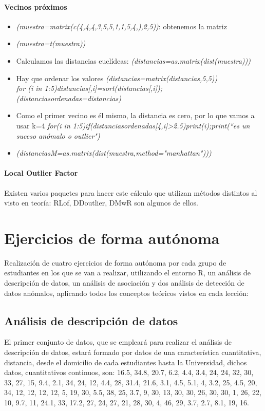 \documentclass[a4paper, 12pt]{article}
\begin{document}
        \paragraph{Vecinos próximos}
        \begin{itemize}
            \item \emph{(muestra=matrix(c(4,4,4,3,5,5,1,1,5,4,),2,5))}: obtenemos la matriz
            \item \emph{(muestra=t(muestra))}
            \item Calculamos las distancias euclídeas: \emph{(distancias=as.matrix(dist(muestra)))}
            \item Hay que ordenar los valores \emph{(distancias=matrix(distancias,5,5))}
            \\ \emph{for (i in 1:5){distancias[,i]=sort(distancias[,i])}; (distanciasordenadas=distancias)}
            \item Como el primer vecino es él mismo, la distancia es cero, por lo que vamos a usar k=4 \emph{for(i in 1:5){if(distanciasordenadas[4,i]>2.5){print(i);print(\textquotedblleft es un suceso anómalo o outlier")}}}
            \item \emph{(distanciasM=as.matrix(dist(muestra,method="manhattan")))}
        \end{itemize}

        \paragraph{Local Outlier Factor}
            Existen varios paquetes para hacer este cálculo que utilizan métodos distintos al visto en teoría: RLof, DDoutlier, DMwR son algunos de ellos.
    
\section{Ejercicios de forma autónoma}
    Realización de cuatro ejercicios de forma autónoma por cada grupo de estudiantes en los que se van a realizar, utilizando el entorno R, un análisis de descripción de datos, un análisis de asociación y dos análisis de detección de datos anómalos, aplicando todos los conceptos teóricos vistos en cada lección:
    
    \subsection{Análisis de descripción de datos}
        El primer conjunto de datos, que se empleará para realizar el análisis de descripción de datos, estará formado por datos de una característica cuantitativa, distancia, desde el domicilio de cada estudiantes hasta la Universidad, dichos datos, cuantitativos continuos, son: 16.5, 34.8, 20.7, 6.2, 4.4, 3.4, 24, 24, 32, 30, 33, 27, 15, 9.4, 2.1, 34, 24, 12, 4.4, 28, 31.4, 21.6, 3.1, 4.5, 5.1, 4, 3.2, 25, 4.5, 20, 34, 12, 12, 12, 12, 5, 19, 30, 5.5, 38, 25, 3.7, 9, 30, 13, 30, 30, 26, 30, 30, 1, 26, 22, 10, 9.7, 11, 24.1, 33, 17.2, 27, 24, 27, 21, 28, 30, 4, 46, 29, 3.7, 2.7, 8.1, 19, 16.
\end{document}

